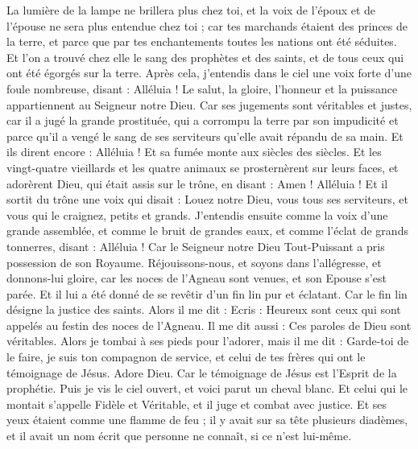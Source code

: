 \begin{multicols}{2}
La lumière de la lampe ne brillera plus chez toi, et la voix de l'époux et de l'épouse ne sera plus entendue chez toi ; car tes marchands étaient des princes de la terre, et parce que par tes enchantements toutes les nations ont été séduites.
Et l’on a trouvé chez elle le sang des prophètes et des saints, et de tous ceux qui ont été égorgés sur la terre.
\VerseOne{}Après cela, j'entendis dans le ciel une voix forte d'une foule nombreuse, disant : Alléluia ! Le salut, la gloire, l'honneur et la puissance appartiennent au Seigneur notre Dieu.
Car ses jugements sont véritables et justes, car il a jugé la grande prostituée, qui a corrompu la terre par son impudicité et parce qu'il a vengé le sang de ses serviteurs qu’elle avait répandu de sa main.
Et ils dirent encore : Alléluia ! Et sa fumée monte aux siècles des siècles.
Et les vingt-quatre vieillards et les quatre animaux se prosternèrent sur leurs faces, et adorèrent Dieu, qui était assis sur le trône, en disant : Amen ! Alléluia !
Et il sortit du trône une voix qui disait : Louez notre Dieu, vous tous ses serviteurs, et vous qui le craignez, petits et grands{}.
J'entendis ensuite comme la voix d'une grande assemblée, et comme le bruit de grandes eaux, et comme l'éclat de grands tonnerres, disant : Alléluia ! Car le Seigneur notre Dieu Tout-Puissant a pris possession de son Royaume.
Réjouissons-nous, et soyons dans l’allégresse, et donnons-lui gloire, car les noces de l'Agneau sont venues, et son Epouse s'est parée.
Et il lui a été donné de se revêtir d’un fin lin pur et éclatant. Car le fin lin désigne la justice des saints.
Alors il me dit : Ecris : Heureux sont ceux qui sont appelés au festin des noces de l'Agneau{}. Il me dit aussi : Ces paroles de Dieu sont véritables.
Alors je tombai à ses pieds pour l'adorer, mais il me dit : Garde-toi de le faire, je suis ton compagnon de service, et celui de tes frères qui ont le témoignage de Jésus. Adore Dieu. Car le témoignage de Jésus est l'Esprit de la prophétie.
Puis je vis le ciel ouvert, et voici parut un cheval blanc. Et celui qui le montait s’appelle Fidèle et Véritable, et il juge et combat avec justice.
Et ses yeux étaient comme une flamme de feu ; il y avait sur sa tête plusieurs diadèmes, et il avait un nom écrit que personne ne connaît, si ce n’est lui-même.

\end{multicols}
